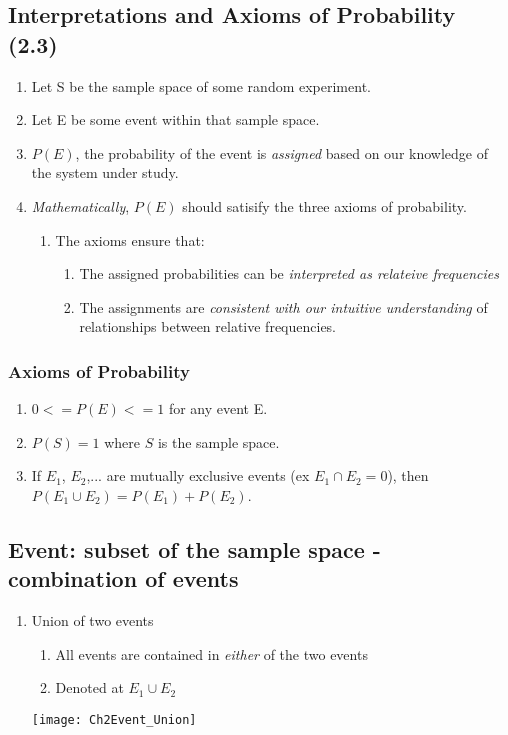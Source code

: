 \documentclass[../IND E 315.tex]{subfiles}
\begin{document}
\subsection*{Interpretations and Axioms of Probability (2.3)}
\begin{enumerate}
    \item Let S be the sample space of some random experiment.
    \item Let E be some event within that sample space.
    \item $P(E)$, the probability of the event is \emph{assigned} based on our knowledge of the system under study.
    \item \emph{Mathematically}, $P(E)$ should satisify the three axioms of probability.
        \begin{enumerate}
            \item The axioms ensure that:
                \begin{enumerate}
                    \item The assigned probabilities can be \emph{interpreted as relateive frequencies}
                    \item The assignments are \emph{consistent with our intuitive understanding} of relationships between relative frequencies.
                \end{enumerate}
        \end{enumerate}
\end{enumerate}

\subsubsection*{Axioms of Probability}
\begin{enumerate}
    \item $0 <= P(E) <= 1$ for any event E.
    \item $P(S) = 1$ where $S$ is the sample space.
    \item If $E_1$, $E_2$,... are mutually exclusive events (ex $E_1 \cap E_2 = 0$), then $P(E_1 \cup E_2) = P(E_1) + P(E_2)$.
\end{enumerate}

\subsection*{Event: subset of the sample space - combination of events}
\begin{enumerate}
    \item Union of two events
        \begin{enumerate}
            \item All events are contained in \emph{either} of the two events
            \item Denoted at $E_1 \cup E_2$
        \end{enumerate}
        \begin{center}
            \texttt{[image: Ch2Event\_Union]}
        \end{center}
\end{enumerate}
\end{document}
